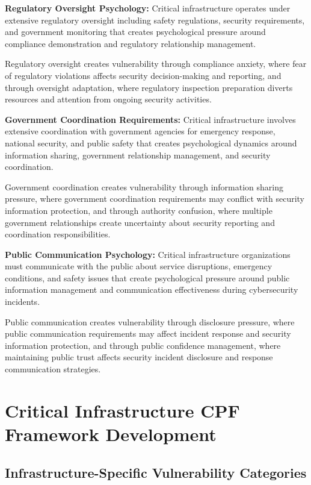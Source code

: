 \documentclass[10pt, twocolumn]{article}
\begin{document}
\textbf{Regulatory Oversight Psychology:} Critical infrastructure operates under extensive regulatory oversight including safety regulations, security requirements, and government monitoring that creates psychological pressure around compliance demonstration and regulatory relationship management.

Regulatory oversight creates vulnerability through compliance anxiety, where fear of regulatory violations affects security decision-making and reporting, and through oversight adaptation, where regulatory inspection preparation diverts resources and attention from ongoing security activities.

\textbf{Government Coordination Requirements:} Critical infrastructure involves extensive coordination with government agencies for emergency response, national security, and public safety that creates psychological dynamics around information sharing, government relationship management, and security coordination.

Government coordination creates vulnerability through information sharing pressure, where government coordination requirements may conflict with security information protection, and through authority confusion, where multiple government relationships create uncertainty about security reporting and coordination responsibilities.

\textbf{Public Communication Psychology:} Critical infrastructure organizations must communicate with the public about service disruptions, emergency conditions, and safety issues that create psychological pressure around public information management and communication effectiveness during cybersecurity incidents.

Public communication creates vulnerability through disclosure pressure, where public communication requirements may affect incident response and security information protection, and through public confidence management, where maintaining public trust affects security incident disclosure and response communication strategies.

\section{Critical Infrastructure CPF Framework Development}

\subsection{Infrastructure-Specific Vulnerability Categories}
\end{document}
